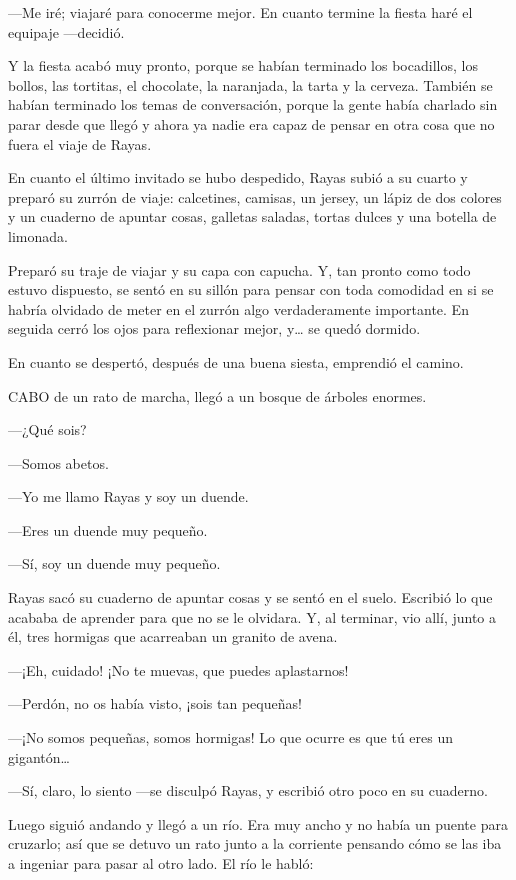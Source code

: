 \documentclass{barcodevapor3pags}
\begin{document}
---Me iré; viajaré para conocerme mejor. En cuanto termine la fiesta
haré el equipaje ---decidió.

Y la fiesta acabó muy pronto, porque se habían terminado los bocadillos,
los bollos, las tortitas, el chocolate, la naranjada, la tarta y la
cerveza. También se habían terminado los temas de conversación, porque
la gente había charlado sin parar desde que llegó y ahora ya nadie era
capaz de pensar en otra cosa que no fuera el viaje de Rayas.

En cuanto el último invitado se hubo despedido, Rayas subió a su cuarto
y preparó su zurrón de viaje: calcetines, camisas, un jersey, un lápiz
de dos colores y un cuaderno de apuntar cosas, galletas saladas, tortas
dulces y una botella de limonada.



Preparó su traje de viajar y su capa con capucha. Y, tan pronto como
todo estuvo dispuesto, se sentó en su sillón para pensar con toda
comodidad en si se habría olvidado de meter en el zurrón algo
verdaderamente importante. En seguida cerró los ojos para reflexionar
mejor, y\ldots{} se quedó dormido.

En cuanto se despertó, después de una buena siesta, emprendió el camino.

\capitulo

 CABO de un rato de marcha, llegó a un bosque de árboles enormes.

---¿Qué sois?

---Somos abetos.

---Yo me llamo Rayas y soy un duende.

---Eres un duende muy pequeño.

---Sí, soy un duende muy pequeño.

Rayas sacó su cuaderno de apuntar cosas y se sentó en el suelo. Escribió
lo que acababa de aprender para que no se le olvidara. Y, al terminar,
vio allí, junto a él, tres hormigas que acarreaban un granito de avena.

---¡Eh, cuidado! ¡No te muevas, que puedes aplastarnos!

---Perdón, no os había visto, ¡sois tan pequeñas!

---¡No somos pequeñas, somos hormigas! Lo que ocurre es que tú eres un
gigantón\ldots{}

---Sí, claro, lo siento ---se disculpó Rayas, y escribió otro poco en su
cuaderno.

Luego siguió andando y llegó a un río. Era muy ancho y no había un
puente para cruzarlo; así que se detuvo un rato junto a la corriente
pensando cómo se las iba a ingeniar para pasar al otro lado. El río le
habló:
\end{document}
